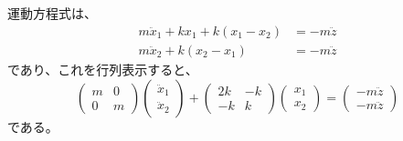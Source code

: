\documentclass[a4paper]{jsarticle}
\begin{document}
\subsection{}
運動方程式は、
\begin{equation}
  \begin{aligned}
    m \ddot{x}_1 + k x_1 + k (x_1 - x_2) &= -m \ddot{z} \\
    m \ddot{x}_2 + k (x_2 - x_1) &= -m \ddot{z}
  \end{aligned}
\end{equation}
であり、これを行列表示すると、
\begin{equation}
  \begin{pmatrix}
    m & 0 \\
    0 & m
  \end{pmatrix}
  \begin{pmatrix}
    \ddot{x}_1 \\
    \ddot{x}_2
  \end{pmatrix} +
  \begin{pmatrix}
    2k & -k \\
    -k & k
  \end{pmatrix}
  \begin{pmatrix}
    x_1 \\ x_2
  \end{pmatrix} =
  \begin{pmatrix}
    -m \ddot{z} \\
    -m \ddot{z}
  \end{pmatrix}
\end{equation}
である。
\end{document}
